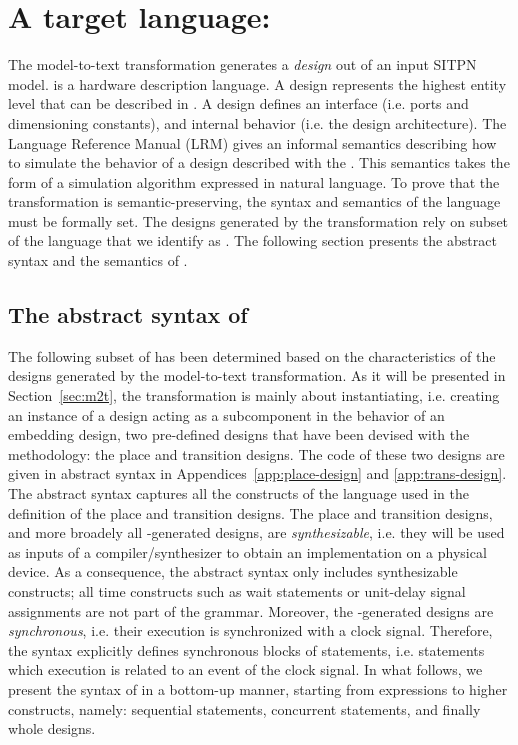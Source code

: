 \section{A target language: \hvhdl{}}
\label{sec:hvhdl}

The \hilecop{} model-to-text transformation generates a \vhdl{}
\emph{design} out of an input SITPN model.  \vhdl{} is a hardware
description language. A design represents the highest entity level
that can be described in \vhdl{}. A design defines an interface
(i.e. ports and dimensioning constants), and internal behavior
(i.e. the design architecture). The \vhdl{} Language Reference Manual
(LRM)\cite{VHDL2000} gives an informal semantics describing how to
simulate the behavior of a design described with the \vhdl{}. This
semantics takes the form of a simulation algorithm expressed in
natural language. To prove that the \hilecop{} transformation is
semantic-preserving, the syntax and semantics of the \vhdl{} language
must be formally set. The designs generated by the \hilecop{}
transformation rely on subset of the \vhdl{} language that we identify
as \hvhdl{}. The following section presents the abstract syntax and
the semantics of \hvhdl{}.

\subsection{The abstract syntax of \hvhdl{}}
\label{subsec:abs-syntax}

The following subset of \vhdl{} has been determined based on the
characteristics of the designs generated by the \hilecop{}
model-to-text transformation. As it will be presented in
Section~\ref{sec:m2t}, the \hilecop{} transformation is mainly about
instantiating, i.e. creating an instance of a design acting as a
subcomponent in the behavior of an embedding design, two pre-defined
designs that have been devised with the methodology: the place and
transition designs. The \vhdl{} code of these two designs are given in
abstract syntax in Appendices~\ref{app:place-design} and
\ref{app:trans-design}. The \hvhdl{} abstract syntax captures all the
constructs of the \vhdl{} language used in the definition of the place
and transition designs. The place and transition designs, and more
broadely all \hilecop{}-generated designs, are \textit{synthesizable},
i.e. they will be used as inputs of a compiler/synthesizer to obtain
an implementation on a physical device. As a consequence, the \hvhdl{}
abstract syntax only includes synthesizable constructs; all time
constructs such as wait statements or unit-delay signal assignments
are not part of the grammar. Moreover, the \hilecop{}-generated
designs are \textit{synchronous}, i.e. their execution is synchronized
with a clock signal. Therefore, the \hvhdl{} syntax explicitly defines
synchronous blocks of statements, i.e. statements which execution is
related to an event of the clock signal.  In what follows, we present
the syntax of \hvhdl{} in a bottom-up manner, starting from
expressions to higher constructs, namely: sequential statements,
concurrent statements, and finally whole designs.

